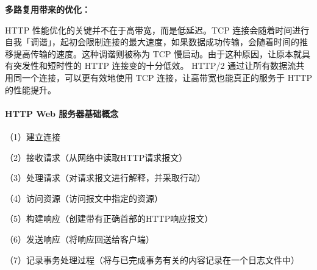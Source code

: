 {\bfseries 多路复用带来的优化：}

H\+T\+TP 性能优化的关键并不在于高带宽，而是低延迟。\+T\+CP 连接会随着时间进行自我「调谐」，起初会限制连接的最大速度，如果数据成功传输，会随着时间的推移提高传输的速度。这种调谐则被称为 T\+CP 慢启动。由于这种原因，让原本就具有突发性和短时性的 H\+T\+TP 连接变的十分低效。 H\+T\+T\+P/2 通过让所有数据流共用同一个连接，可以更有效地使用 T\+CP 连接，让高带宽也能真正的服务于 H\+T\+TP 的性能提升。

 



\paragraph*{H\+T\+TP Web 服务器基础概念}



（1）建立连接

（2）接收请求（从网络中读取\+H\+T\+T\+P请求报文）

（3）处理请求（对请求报文进行解释，并采取行动）

（4）访问资源（访问报文中指定的资源）

（5）构建响应（创建带有正确首部的\+H\+T\+T\+P响应报文）

（6）发送响应（将响应回送给客户端）

（7）记录事务处理过程（将与已完成事务有关的内容记录在一个日志文件中） 